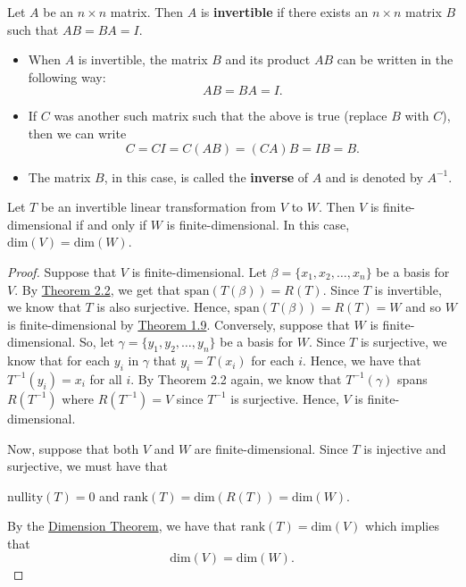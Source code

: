 \begin{definition}
   Let \( A  \) be an \( n \times n  \) matrix. Then \( A  \) is \textbf{invertible} if there exists an \( n \times n  \) matrix \( B  \) such that \( AB = BA = I  \).
\end{definition}

\begin{itemize}
    \item When \( A  \) is invertible, the matrix \( B  \) and its product \( AB  \) can be written in the following way:
        \[  AB = BA = I. \]
    \item If \( C  \) was another such matrix such that the above is true (replace \( B  \) with \( C  \)), then we can write 
        \[  C = CI = C(AB) = (CA)B = IB = B.   \]
    \item The matrix \( B  \), in this case, is called the \textbf{inverse} of \( A  \) and is denoted by \( A^{-1} \). 
\end{itemize}

\begin{lemma}
   Let \( T \) be an invertible linear transformation from \( V  \) to \( W  \). Then \( V  \) is finite-dimensional if and only if \( W  \) is finite-dimensional. In this case, \( \text{dim}(V ) = \text{dim}(W) \). 
\end{lemma}
\begin{proof}
    Suppose that \( V  \) is finite-dimensional. Let \( \beta = \{  {x}_{1}, {x}_{2}, \dots, {x}_{n} \}  \) be a basis for \( V  \). By {\hyperref[Spanning set for R(T)]{Theorem 2.2}}, we get that \( \text{span}(T(\beta)) = R(T) \). Since \( T  \) is invertible, we know that \( T  \) is also surjective. Hence, \( \text{span}(T(\beta)) = R(T) = W  \) and so \( W  \) is finite-dimensional by {\hyperref[Theorem 1.9]{Theorem 1.9}}. Conversely, suppose that \( W  \) is finite-dimensional. So, let \( \gamma = \{ {y}_{1}, {y}_{2}, \dots, {y}_{n} \}   \) be a basis for \( W  \). Since \( T  \) is surjective, we know that for each \( {y}_{i} \) in \( \gamma \) that \( {y}_{i} = T({x}_{i}) \) for each \( i  \). Hence, we have that \( T^{-1}({y}_{i}) = {x}_{i} \) for all \( i \). By Theorem 2.2 again, we know that \( T^{-1}(\gamma) \) spans \( R(T^{-1}) \) where \( R(T^{-1}) = V  \) since \( T^{-1}  \) is surjective. Hence, \( V  \) is finite-dimensional.
    
    Now, suppose that both \( V  \) and \( W  \) are finite-dimensional. Since \( T  \) is injective and surjective, we must have that
    \begin{center}
        \( \text{nullity}(T) = 0  \) and \( \text{rank}(T) = \text{dim}(R(T)) = \text{dim}(W) \).
    \end{center}
    By the {\hyperref[Dimension Theorem]{Dimension Theorem}}, we have that \( \text{rank}(T) = \text{dim}(V) \) which implies that 
    \[  \text{dim}(V) = \text{dim}(W). \]
\end{proof}

